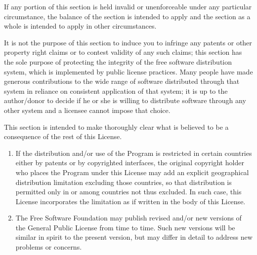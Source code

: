 \documentclass[letterpaper,10pt,english]{sphinxmanual}
\begin{document}
\sphinxAtStartPar
If any portion of this section is held invalid or unenforceable under any particular circumstance, the balance of the section is intended to apply and the section as a whole is intended to apply in other circumstances.

\sphinxAtStartPar
It is not the purpose of this section to induce you to infringe any patents or other property right claims or to contest validity of any such claims; this section has the sole purpose of protecting the integrity of the free software distribution system, which is implemented by public license practices. Many people have made generous contributions to the wide range of software distributed through that system in reliance on consistent application of that system; it is up to the author/donor to decide if he or she is willing to distribute software through any other system and a licensee cannot impose that choice.

\sphinxAtStartPar
This section is intended to make thoroughly clear what is believed to be a consequence of the rest of this License.
\begin{enumerate}
%
\setcounter{enumi}{7}
\item {} 
\sphinxAtStartPar
If the distribution and/or use of the Program is restricted in certain countries either by patents or by copyrighted interfaces, the original copyright holder who places the Program under this License may add an explicit geographical distribution limitation excluding those countries, so that distribution is permitted only in or among countries not thus excluded. In such case, this License incorporates the limitation as if written in the body of this License.

\item {} 
\sphinxAtStartPar
The Free Software Foundation may publish revised and/or new versions of the General Public License from time to time. Such new versions will be similar in spirit to the present version, but may differ in detail to address new problems or concerns.

\end{enumerate}
\end{document}
